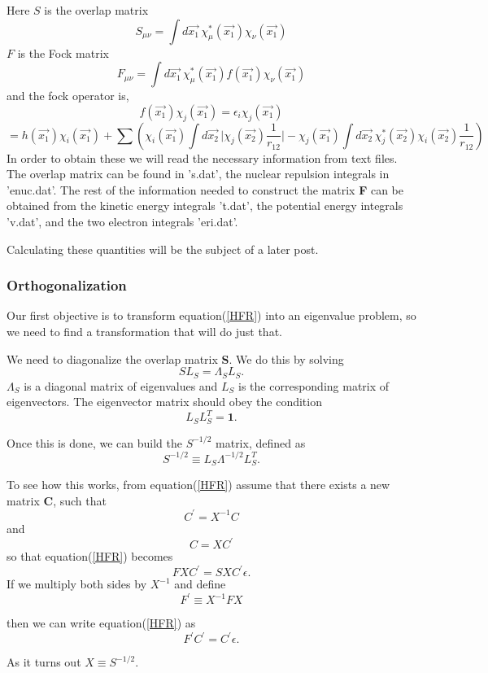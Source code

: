 \documentclass[a4paper]{article}
\begin{document}
Here $S$ is the overlap matrix
$$
S_{\mu\nu} = \int d\vec{x_1} \, \chi^{*}_{\mu}(\vec{x_1}) \chi_{\nu}(\vec{x_1})
$$
$F$ is the Fock matrix 
$$
 F_{\mu\nu} = \int d\vec{x_1} \, \chi^{*}_{\mu}(\vec{x_1}) f(\vec{x_1}) \chi_{\nu}(\vec{x_1})
$$
and the fock operator is,
$$
f(\vec{x_1}) \chi_j (\vec{x_1}) = \epsilon_i \chi_j (\vec{x_1})
$$
$$
=  h(\vec{x_1})\chi_i(\vec{x_1}) + \sum \left(\chi_i(\vec{x_1}) \int d\vec{x_2} \, \Big|\chi_j(\vec{x_2}) \frac{1}{r_12}\Big| -
\chi_j(\vec{x_1})\int d\vec{x_2} \, \chi^{*}_{j}(\vec{x_2})\chi_i(\vec{x_2})\frac{1}{r_{12}} \right) 
$$
In order to obtain these we will read the necessary information from text files.
The overlap matrix can be found in 's.dat', the nuclear repulsion integrals in 'enuc.dat'.
The rest of the information needed to construct the matrix \textbf{F} can be obtained from the kinetic energy integrals 't.dat', the potential energy integrals 'v.dat', and the two electron integrals 'eri.dat'.

Calculating these quantities will be the subject of a later post.

\subsubsection{Orthogonalization}
Our first objective is to transform equation(\ref{HFR}) into an eigenvalue problem, so we need to find a transformation that will do just that.

We need to diagonalize the overlap matrix \textbf{S}. 
We do this by solving
$$
S L_S = \Lambda_S L_S.
$$
$\Lambda_S$ is a diagonal matrix of eigenvalues and $L_S$ is the corresponding matrix of eigenvectors.
The eigenvector matrix should obey the condition
$$
L_S L^{T}_{S} = \boldsymbol 1.
$$

Once this is done, we can build the $ S^{-1/2}$ matrix, defined as 
$$
S^{-1/2} \equiv L_S \Lambda^{-1/2} L^{T}_{S}.
$$



To see how this works, from equation(\ref{HFR}) assume that there exists a new matrix \textbf{C}, such that
$$
C^' = X^{-1} C
$$
and 
$$
C = X C^'
$$
so that equation(\ref{HFR}) becomes
$$
F X C^' = SXC^' \epsilon.
$$
If we multiply both sides by $X^{-1}$ and define
$$
F^' \equiv X^{-1} F X
$$

then we can write equation(\ref{HFR}) as 
$$
F^' C^' = C^' \epsilon.
$$

As it turns out $X \equiv S^{-1/2}$.
\end{document}
